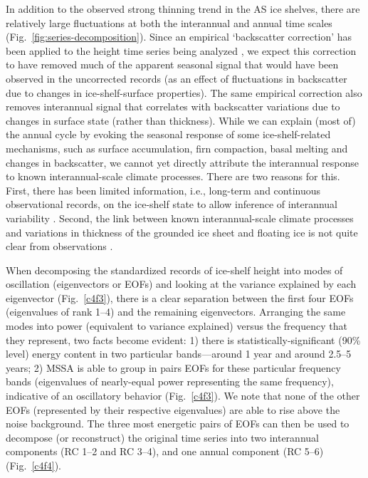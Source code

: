 \noindent
In addition to the observed strong thinning trend in the AS ice shelves, there are relatively large fluctuations at both the interannual and annual time scales (Fig.~\ref{fig:series-decomposition}). Since an empirical `backscatter correction' has been applied to the height time series being analyzed \parencite{Paolo2015a}, we expect this correction to have removed much of the apparent seasonal signal that would have been observed in the uncorrected records (as an effect of fluctuations in backscatter due to changes in ice-shelf-surface properties). The same empirical correction also removes interannual signal that correlates with backscatter variations due to changes in surface state (rather than thickness). While we can explain (most of) the annual cycle by evoking the seasonal response of some ice-shelf-related mechanisms, such as surface accumulation, firn compaction, basal melting and changes in backscatter, we cannot yet directly attribute the interannual response to known interannual-scale climate processes. There are two reasons for this. First, there has been limited information, i.e., long-term and continuous observational records, on the ice-shelf state to allow inference of interannual variability \parencite{Paolo2015}. Second, the link between known interannual-scale climate processes and variations in thickness of the grounded ice sheet and floating ice is not quite clear from observations \parencite[e.g.,][]{Dutrieux2014, Steig2013, Turner2004}. 

When decomposing the standardized records of ice-shelf height into modes of oscillation (eigenvectors or EOFs) and looking at the variance explained by each eigenvector (Fig.~\ref{c4f3}), there is a clear separation between the first four EOFs (eigenvalues of rank 1--4) and the remaining eigenvectors. Arranging the same modes into power (equivalent to variance explained) versus the frequency that they represent, two facts become evident: 1) there is statistically-significant (90\% level) energy content in two particular bands---around 1 year and around 2.5--5 years; 2) MSSA is able to group in pairs EOFs for these particular frequency bands (eigenvalues of nearly-equal power representing the same frequency), indicative of an oscillatory behavior (Fig.~\ref{c4f3}). We note that none of the other EOFs (represented by their respective eigenvalues) are able to rise above the noise background. The three most energetic pairs of EOFs can then be used to decompose (or reconstruct) the original time series into two interannual components (RC 1--2 and RC 3--4), and one annual component (RC 5--6) (Fig.~\ref{c4f4}).


